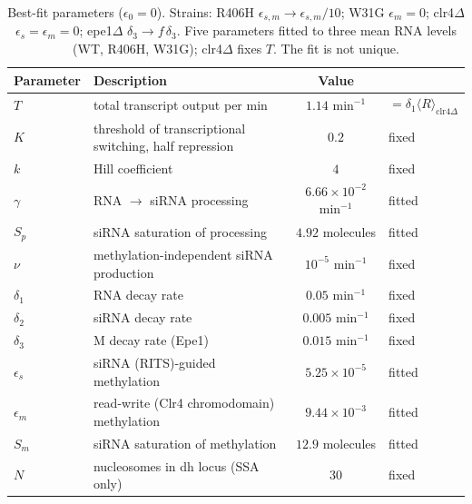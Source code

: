 \begin{table}[h]
\centering
\begin{tabular}{llcl}
\hline
Parameter & Description & Value & \\
\hline
$T$ & total transcript output per min & $1.14$ $\text{min}^{-1}$ & $=\delta_1\langle R\rangle_{\text{clr4}\Delta}$ \\
$K$ & threshold of transcriptional switching, half repression & $0.2$ & fixed \\
$k$ & Hill coefficient & $4$ & fixed \\
$\gamma$ & RNA $\to$ siRNA processing & $6.66\times10^{-2}$ $\text{min}^{-1}$ & fitted \\
$S_p$ & siRNA saturation of processing & $4.92$ molecules & fitted \\
$\nu$ & methylation-independent siRNA production & $10^{-5}$ $\text{min}^{-1}$ & fixed \\
$\delta_1$ & RNA decay rate & $0.05$ $\text{min}^{-1}$ & fixed \\
$\delta_2$ & siRNA decay rate & $0.005$ $\text{min}^{-1}$ & fixed \\
$\delta_3$ & M decay rate (Epe1) & $0.015$ $\text{min}^{-1}$ & fixed \\
$\epsilon_s$ & siRNA (RITS)-guided methylation & $5.25\times10^{-5}$ & fitted \\
$\epsilon_m$ & read-write (Clr4 chromodomain) methylation & $9.44\times10^{-3}$ & fitted \\
$S_m$ & siRNA saturation of methylation & $12.9$ molecules & fitted \\
$N$ & nucleosomes in dh locus (SSA only) & $30$ & fixed \\
\hline
\end{tabular}
\caption{Best-fit parameters ($\epsilon_0=0$). Strains: R406H $\epsilon_{s,m}\to\epsilon_{s,m}/10$;
W31G $\epsilon_m=0$; clr4$\Delta$ $\epsilon_s=\epsilon_m=0$; epe1$\Delta$ $\delta_3\to f\,\delta_3$.
Five parameters fitted to three mean RNA levels (WT, R406H, W31G); clr4$\Delta$ fixes $T$.
The fit is not unique.}
\end{table}

